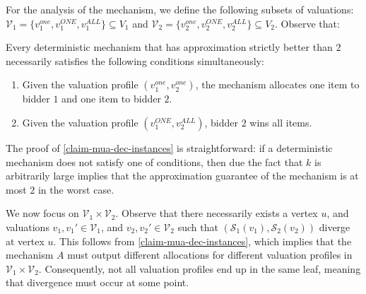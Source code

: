 For the analysis of the mechanism, we define the following subsets of valuations:
$
\mathcal{V}_1=\{v_1^{one},v_1^{ONE},\allowbreak v_1^{ALL}\}\allowbreak \subseteq V_1$ and  $\mathcal{V}_2=\{v_2^{one},v_2^{ONE},v_2^{ALL}\}\subseteq V_2$.  
Observe that:
\begin{claim}\label{claim-mua-dec-instances}
Every deterministic mechanism that has approximation strictly better than $2$ necessarily satisfies the following  conditions simultaneously:
\begin{enumerate}
    \item Given the valuation profile $(v_1^{one},v_2^{one})$, the mechanism
    allocates one item to bidder $1$ and one item to bidder $2$. \label{condi-1-dec}
    \item Given the valuation profile $(v_1^{ONE}, v_2^{ALL})$, bidder $2$ wins all items.
    \label{condi-3-dec}
\end{enumerate}
\end{claim}
The proof of \cref{claim-mua-dec-instances} is straightforward: if a deterministic mechanism does not satisfy one of conditions, then due the fact that $k$ is arbitrarily large implies that the approximation guarantee of the mechanism is at most $2$ in the worst case.  


We now focus on 
$
\mathcal{V}_1\times \mathcal{V}_2$. 
Observe that there necessarily exists a vertex $u$, and valuations $v_1,v_1' \in \mathcal{V}_1$, and  $v_2,v_2' \in \mathcal{V}_2$ such that $(\mathcal{S}_1(v_1), \mathcal{S}_2(v_2))$ diverge at vertex $u$. This follows from \cref{claim-mua-dec-instances}, which implies that the mechanism $A$ must output different allocations for different valuation profiles in $\mathcal{V}_1 \times \mathcal{V}_2$. Consequently, not all valuation profiles end up in the same leaf, meaning that divergence must occur at some point. 


